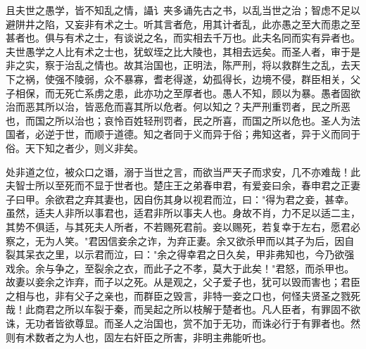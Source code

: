 \documentclass[]{article}
\begin{document}
且夫世之愚学，皆不知乱之情，讘讠夹多诵先古之书，以乱当世之治；智虑不足以避阱井之陷，又妄非有术之士。听其言者危，用其计者乱，此亦愚之至大而患之至甚者也。俱与有术之士，有谈说之名，而实相去千万也。此夫名同而实有异者也。夫世愚学之人比有术之士也，犹蚁垤之比大陵也，其相去远矣。而圣人者，审于是非之实，察于治乱之情也。故其治国也，正明法，陈严刑，将以救群生之乱，去天下之祸，使强不陵弱，众不暴寡，耆老得遂，幼孤得长，边境不侵，群臣相关，父子相保，而无死亡系虏之患，此亦功之至厚者也。愚人不知，顾以为暴。愚者固欲治而恶其所以治，皆恶危而喜其所以危者。何以知之？夫严刑重罚者，民之所恶也，而国之所以治也；哀怜百姓轻刑罚者，民之所喜，而国之所以危也。圣人为法国者，必逆于世，而顺于道德。知之者同于义而异于俗；弗知这者，异于义而同于俗。天下知之者少，则义非矣。

处非道之位，被众口之谮，溺于当世之言，而欲当严天子而求安，几不亦难哉！此夫智士所以至死而不显于世者也。楚庄王之弟春申君，有爱妾曰余，春申君之正妻子曰甲。余欲君之弃其妻也，因自伤其身以视君而泣，曰："得为君之妾，甚幸。虽然，适夫人非所以事君也，适君非所以事夫人也。身故不肖，力不足以适二主，其势不俱适，与其死夫人所者，不若赐死君前。妾以赐死，若复幸于左右，愿君必察之，无为人笑。"君因信妾余之诈，为弃正妻。余又欲杀甲而以其子为后，因自裂其呆衣之里，以示君而泣，曰："余之得幸君之日久矣，甲非弗知也，今乃欲强戏余。余与争之，至裂余之衣，而此子之不孝，莫大于此矣！"君怒，而杀甲也。故妻以妾余之诈弃，而子以之死。从是观之，父子爱子也，犹可以毁而害也；君臣之相与也，非有父子之亲也，而群臣之毁言，非特一妾之口也，何怪夫贤圣之戮死哉！此商君之所以车裂于秦，而吴起之所以枝解于楚者也。凡人臣者，有罪固不欲诛，无功者皆欲尊显。而圣人之治国也，赏不加于无功，而诛必行于有罪者也。然则有术数者之为人也，固左右奸臣之所害，非明主弗能听也。
\end{document}
